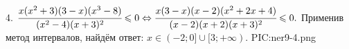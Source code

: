 4. $\cfrac{x(x^2+3)(3-x)(x^3-8)}{(x^2-4)(x+3)^2}\leqslant 0 \Leftrightarrow \cfrac{x(3-x)(x-2)(x^2+2x+4)}{(x-2)(x+2)(x+3)^2}\leqslant 0.$ Применив метод интервалов, найдём ответ: $x\in(-2;0]\cup[3;+\infty).$
{{PIC:ner9-4.png}}\\
